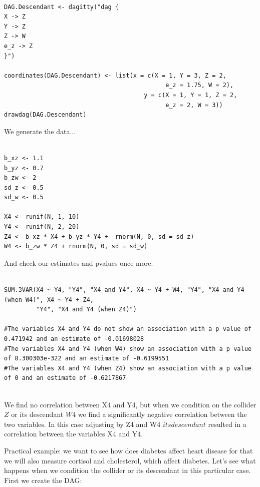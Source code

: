 \documentclass{article}
\begin{document}
\begin{lstlisting}

DAG.Descendant <- dagitty("dag {
X -> Z
Y -> Z
Z -> W
e_z -> Z
}")

coordinates(DAG.Descendant) <- list(x = c(X = 1, Y = 3, Z = 2, 
                                             e_z = 1.75, W = 2),
                                       y = c(X = 1, Y = 1, Z = 2, 
                                             e_z = 2, W = 3))
drawdag(DAG.Descendant)

\end{lstlisting}




We generate the data...


\begin{lstlisting}

b_xz <- 1.1
b_yz <- 0.7
b_zw <- 2
sd_z <- 0.5
sd_w <- 0.5

X4 <- runif(N, 1, 10)
Y4 <- runif(N, 2, 20)
Z4 <- b_xz * X4 + b_yz * Y4 +  rnorm(N, 0, sd = sd_z)
W4 <- b_zw * Z4 + rnorm(N, 0, sd = sd_w)

\end{lstlisting}

And check our estimates and pvalues once more:

\begin{lstlisting}

SUM.3VAR(X4 ~ Y4, "Y4", "X4 and Y4", X4 ~ Y4 + W4, "Y4", "X4 and Y4 (when W4)", X4 ~ Y4 + Z4,
         "Y4", "X4 and Y4 (when Z4)")

#The variables X4 and Y4 do not show an association with a p value of 0.471942 and an estimate of -0.01698028 
#The variables X4 and Y4 (when W4) show an association with a p value of 8.300303e-322 and an estimate of -0.6199551 
#The variables X4 and Y4 (when Z4) show an association with a p value of 0 and an estimate of -0.6217867 


\end{lstlisting}

We find no correlation between X4 and Y4, but when we condition on the collider \(Z\) or its descendant \(W4\) we find a significantly negative correlation between the two variables. 
In this case adjusting by Z4 and W4 \(its descendant\) resulted in a correlation between the variables X4 and Y4. 



Practical example: we want to see how does diabetes affect heart disease for that we will also measure cortisol and cholesterol, which affect diabetes. Let's see what happens when we condition the collider or its descendant in this particular case. First we create the DAG:
\end{document}

